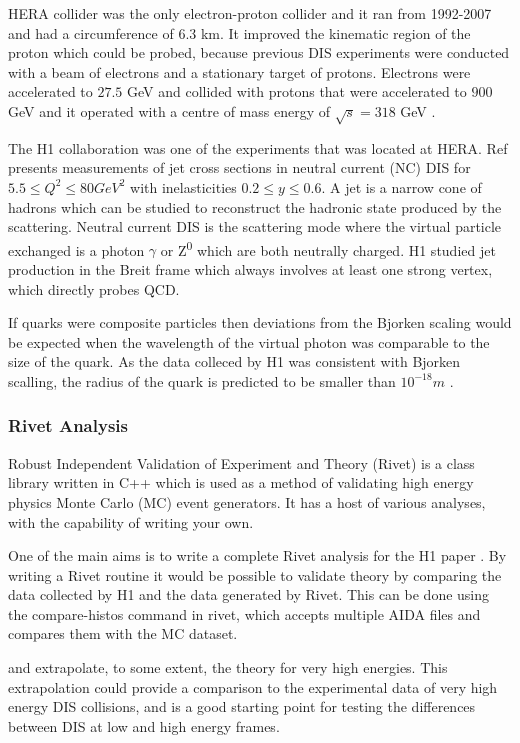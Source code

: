 \documentclass[journal, a4paper,10pt]{IEEEtran}
\begin{document}
HERA collider was the only electron-proton collider and it ran from 1992-2007 and had a circumference of 6.3 km. It improved the kinematic region of the proton which could be probed, because previous DIS experiments were conducted with a beam of electrons and a stationary target of protons. Electrons were accelerated to $27.5$ GeV and collided with protons that were accelerated to $900$ GeV \cite{Modern} and it operated with a centre of mass energy of $\sqrt{s} = 318$ GeV \cite{1308}.

The H1 collaboration \cite{H1} was one of the experiments that was located at HERA. Ref \cite{H1} presents measurements of jet cross sections in neutral current (NC) DIS for $5.5 \leq Q^2 \leq 80 GeV^2$ with inelasticities $0.2 \leq y \leq 0.6$. A jet is a narrow cone of hadrons which can be studied to reconstruct the hadronic state produced by the scattering. Neutral current DIS is the scattering mode where the virtual particle exchanged is a photon $\gamma$ or Z\textsuperscript{0} which are both neutrally charged. H1 studied jet production in the Breit frame which always involves at least one strong vertex, which directly probes QCD.

If quarks were composite particles then deviations from the Bjorken scaling would be expected when the wavelength of the virtual photon was comparable to the size of the quark. As the data colleced by H1 was consistent with Bjorken scalling, the radius of the quark is predicted to be smaller than $10^{-18}m$ \cite{Modern}.


\subsubsection*{Rivet Analysis}

Robust Independent Validation of Experiment and Theory (Rivet) \cite{Rivet} is a class library written in C++ which is used as a method of validating high energy physics Monte Carlo (MC) event generators. It has a host of various analyses, with the capability of writing your own. 

One of the main aims is to write a complete Rivet analysis for the H1 paper \cite{H1}. By writing a Rivet routine it would be possible to validate theory by comparing the data collected by H1 and the data generated by Rivet. This can be done using the {\selectfont compare-histos} command in rivet, which accepts multiple AIDA files and compares them with the MC dataset.

and extrapolate, to some extent, the theory for very high energies. This extrapolation could provide a comparison to the experimental data of very high energy DIS collisions, and is a good starting point for testing the differences between DIS at low and high energy frames.
\end{document}
